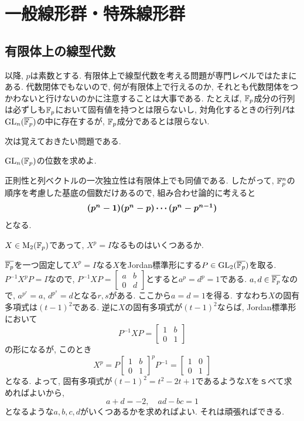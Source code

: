 \section{一般線形群・特殊線形群}

\subsection{有限体上の線型代数}
以降, $p$は素数とする. 有限体上で線型代数を考える問題が専門レベルではたまにある. 代数閉体でもないので, 何が有限体上で行えるのか, それとも代数閉体をつかわないと行けないのかに注意することは大事である. たとえば, $\mathbb{F}_{p}$成分の行列は必ずしも$\mathbb{F}_{p}$において固有値を持つとは限らないし, 対角化するときの行列$P$は$\mathrm{GL}_{n}(\overline{\mathbb{F}_{p}})$の中に存在するが, $\mathbb{F}_{p}$成分であるとは限らない. \par
次は覚えておきたい問題である.
\begin{egprob}
$\mathrm{GL}_{n}(\mathbb{F}_{p})$の位数を求めよ.
\end{egprob}
\begin{egans}
正則性と列ベクトルの一次独立性は有限体上でも同値である. したがって, $\mathbb{F}_{p}^{n}$の順序を考慮した基底の個数だけあるので, 組み合わせ論的に考えると
\[{\mbox{\boldmath $(p^n - 1) (p^n - p) \cdots (p^n - p^{n-1})$}}\]
となる.
\end{egans}


\begin{egprob}
$X\in \mathrm{M}_{2}(\mathbb{F}_{p})$であって, $X^p = I$なるものはいくつあるか.
\end{egprob}
\begin{egans}
$\overline{\mathbb{F}_{p}}$を一つ固定して$X^{p} = I$なる$X$をJordan標準形にする$P\in \mathrm{GL}_{2}(\overline{\mathbb{F}_{p}})$を取る. $P^{-1}X^{p}P = I$なので, $P^{-1}XP = \begin{bmatrix}a&b\\ 0& d\end{bmatrix}$とすると$a^{p} = d^{p} = 1$である. $a,d\in \overline{\mathbb{F}_{p}}$なので, $a^{p^r} = a$, $d^{p^s} = d$となる$r,s$がある. ここから$a=d=1$を得る. すなわち$X$の固有多項式は$(t-1)^2$である. 逆に$X$の固有多項式が$(t-1)^2$ならば, Jordan標準形において
\[P^{-1}X P = \begin{bmatrix} 1& b\\ 0&1 \end{bmatrix} \]
の形になるが, このとき
\[X^{p} = P \begin{bmatrix}1&b\\ 0&1\end{bmatrix}^{p} P^{-1} = \begin{bmatrix}1 & 0 \\ 0 & 1\end{bmatrix}\]
となる. よって, 固有多項式が$(t-1)^2 = t^2 - 2t + 1$であるような$X$をｓべて求めればよいから,
\[a+d = -2,\quad ad-bc = 1\]
となるような$a,b,c,d$がいくつあるかを求めればよい. それは頑張ればできる.
\end{egans}




